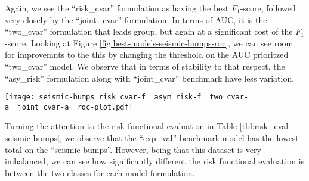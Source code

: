 \documentclass[10pt,letterpaper]{article}
\newcommand{\1}{1{\hskip -2.55 pt}\hbox{I}}
\begin{document}
Again, we see the ``risk\_cvar'' formulation as having the best $F_1$-score, followed very closely by the ``joint\_cvar'' formulation. In terms of AUC, it is the ``two\_cvar'' formulation that leads group, but again at a significant cost of the $F_1$-score. 
Looking at Figure \ref{fig:best-models-seismic-bumps-roc}, we can see room for improvemnts to the this by changing the threshold on the AUC prioritzed ``two\_cvar'' model.
We observe that in terms of stability to that respect, the ``asy\_risk'' formulation along with ``joint\_cvar'' benchmark have less variation.


\begin{figure*}[h!]
\begin{center}
\texttt{[image: seismic-bumps\_risk\_cvar-f\_\_asym\_risk-f\_\_two\_cvar-a\_\_joint\_cvar-a\_\_roc-plot.pdf]}
\caption{ROC plots for the best performing model formulations on the ``seismic-bumps'' data: ``risk\_cvar'' with the best $F_1$-score, ``one\_cvar'', ``joint\_cvar'', ``two\_cvar'' formulation featuring the best AUC value}
\label{fig:best-models-seismic-bumps-roc}
\end{center}
\end{figure*}


Turning the attention to the risk functional evaluation in Table \ref{tbl:risk_eval-seismic-bumps}, we observe that the ``exp\_val'' benchmark model has the lowest total on the ``seismic-bumps''. However, being that this dataset is very imbalanced, we can see how significantly different the risk functional evaluation is between the two classes for each model formulation.
\end{document}

